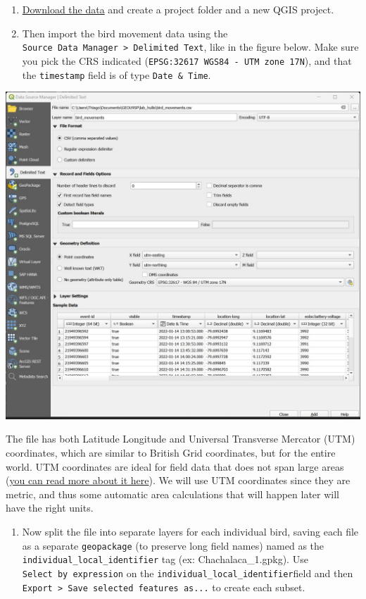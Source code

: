\documentclass[
  letterpaper,
  DIV=11,
  numbers=noendperiod]{scrreprt}
\providecommand{\tightlist}{%
  \setlength{\itemsep}{0pt}\setlength{\parskip}{0pt}}\usepackage{longtable,booktabs,array}
\begin{document}
\begin{enumerate}
\def\labelenumi{(\arabic{enumi})}
\setcounter{enumi}{352}
\item
  \href{https://stir-my.sharepoint.com/:u:/g/personal/ala2_stir_ac_uk/EeG76lKhlLRNjQgGBJOIJYoBxn0ZWhxwjQOhnFiB0LFejQ?e=mZ4qmR}{Download
  the data} and create a project folder and a new QGIS project.
\item
  Then import the bird movement data using the
  \texttt{Source\ Data\ Manager\ \textgreater{}\ Delimited\ Text}, like
  in the figure below. Make sure you pick the CRS indicated
  (\texttt{EPSG:32617\ WGS84\ -\ UTM\ zone\ 17N}), and that the
  \texttt{timestamp} field is of type \texttt{Date\ \&\ Time}.
\end{enumerate}

\includegraphics{images/lab_14/lab14_fig0_import_csv.jpg}

The file has both Latitude Longitude and Universal Transverse Mercator
(UTM) coordinates, which are similar to British Grid coordinates, but
for the entire world. UTM coordinates are ideal for field data that does
not span large areas
(\href{https://en.wikipedia.org/wiki/Universal_Transverse_Mercator_coordinate_system}{you
can read more about it here}). We will use UTM coordinates since they
are metric, and thus some automatic area calculations that will happen
later will have the right units.

\begin{enumerate}
\def\labelenumi{(\arabic{enumi})}
\setcounter{enumi}{354}
\tightlist
\item
  Now split the file into separate layers for each individual bird,
  saving each file as a separate \texttt{geopackage} (to preserve long
  field names) named as the \texttt{individual\_local\_identifier} tag
  (ex: Chachalaca\_1.gpkg). Use \texttt{Select\ by\ expression} on the
  \texttt{individual\_local\_identifier}field and then
  \texttt{Export\ \textgreater{}\ Save\ selected\ features\ as...} to
  create each subset.
\end{enumerate}
\end{document}
